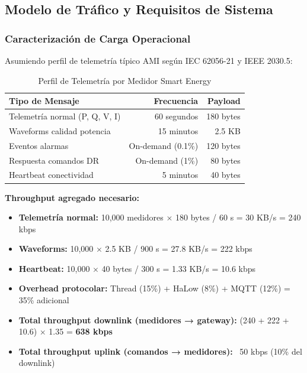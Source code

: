 \subsection{Modelo de Tráfico y Requisitos de Sistema}

\subsubsection{Caracterización de Carga Operacional}

Asumiendo perfil de telemetría típico AMI según IEC 62056-21 y IEEE 2030.5:

\begin{table}[h]
\centering
\caption{Perfil de Telemetría por Medidor Smart Energy}
\label{tab:telemetry-profile-10k}
\begin{tabular}{|l|r|r|}
\hline
\textbf{Tipo de Mensaje} & \textbf{Frecuencia} & \textbf{Payload} \\
\hline
Telemetría normal (P, Q, V, I) & 60 segundos & 180 bytes \\
\hline
Waveforms calidad potencia & 15 minutos & 2.5 KB \\
\hline
Eventos alarmas & On-demand (0.1\%) & 120 bytes \\
\hline
Respuesta comandos DR & On-demand (1\%) & 80 bytes \\
\hline
Heartbeat conectividad & 5 minutos & 40 bytes \\
\hline
\end{tabular}
\end{table}

\textbf{Throughput agregado necesario:}

\begin{itemize}
\item \textbf{Telemetría normal:} 10,000 medidores $\times$ 180 bytes / 60 s = 30 KB/s = 240 kbps
\item \textbf{Waveforms:} 10,000 $\times$ 2.5 KB / 900 s = 27.8 KB/s = 222 kbps
\item \textbf{Heartbeat:} 10,000 $\times$ 40 bytes / 300 s = 1.33 KB/s = 10.6 kbps
\item \textbf{Overhead protocolar:} Thread (15\%) + HaLow (8\%) + MQTT (12\%) = 35\% adicional
\item \textbf{Total throughput downlink (medidores → gateway):} (240 + 222 + 10.6) $\times$ 1.35 = \textbf{638 kbps}
\item \textbf{Total throughput uplink (comandos → medidores):} ~50 kbps (10\% del downlink)
\end{itemize}

